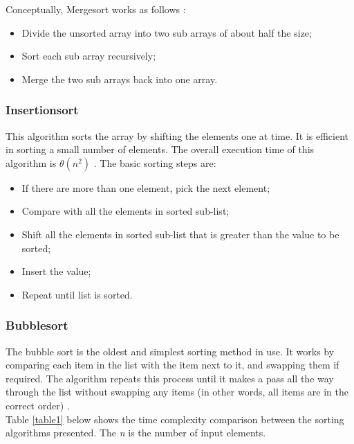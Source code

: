 Conceptually, Mergesort works as follows \cite{Abhyankar2011}:
\begin{itemize}
    \item Divide the unsorted array into two sub arrays of about half the size;
    \item Sort each sub array recursively;
    \item Merge the two sub arrays back into one array.
\end{itemize}

\subsubsection{Insertionsort}

This algorithm sorts the array by shifting the elements one at time. It is efficient in sorting a small number of elements. The overall execution time of this algorithm is $\theta(n^2)$ \cite{Cormen2009}. The basic sorting steps are:
\begin{itemize}
    \item If there are more than one element, pick the next element;
    \item Compare with all the elements in sorted sub-list;
    \item Shift all the elements in sorted sub-list that is greater than the value to be sorted;
    \item Insert the value;
    \item Repeat until list is sorted.
\end{itemize}

\subsubsection{Bubblesort}

The bubble sort is the oldest and simplest sorting method in use. It works by comparing each item in the list with the item next to it, and swapping them if required. The algorithm repeats this process until it makes a pass all the way through the list without swapping any items (in other words, all items are in the correct order) \cite{Mansotra2011}.\\

Table \ref{table1} below shows the time complexity comparison between the sorting algorithms presented. The \textit{n} is the number of input elements.

